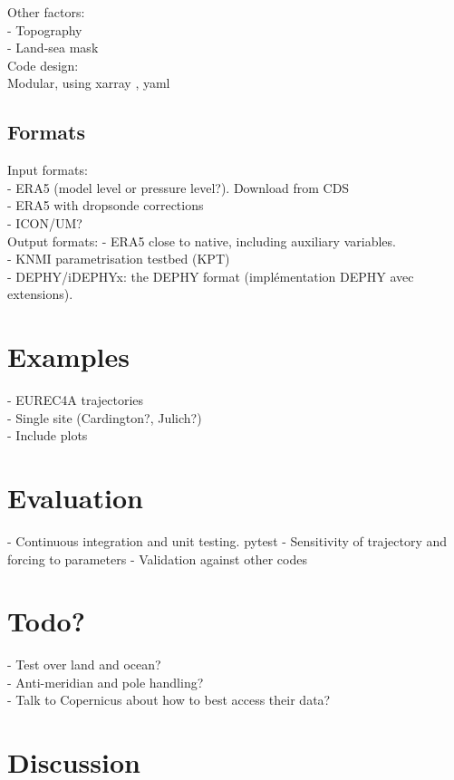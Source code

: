 \documentclass[a4paper,11pt]{article}
\begin{document}
Other factors: \\
- Topography \\
- Land-sea mask \\

Code design: \\
Modular, using xarray \citep{hoyer2017}, yaml \citep{ben2009}

\subsection{Formats}

Input formats: \\
- ERA5 (model level or pressure level?). Download from CDS \citep{raoult2017} \\
- ERA5 with dropsonde corrections \citep{bony2019} \\
- ICON/UM? \\

Output formats:
- ERA5 close to native, including auxiliary variables. \\
- KNMI parametrisation testbed (KPT) \\
- DEPHY/iDEPHYx: the DEPHY format (implémentation DEPHY avec extensions). \\

\section{Examples}

- EUREC4A trajectories \cite{bony2017} \\
- Single site (Cardington?, Julich?) \\
- Include plots

\section{Evaluation}

- Continuous integration and unit testing.
pytest \citep{okken2017}
- Sensitivity of trajectory and forcing to parameters
- Validation against other codes

\section{Todo?}

- Test over land and ocean? \\
- Anti-meridian and pole handling? \\
- Talk to Copernicus about how to best access their data? \\

\section{Discussion}



\end{document}
